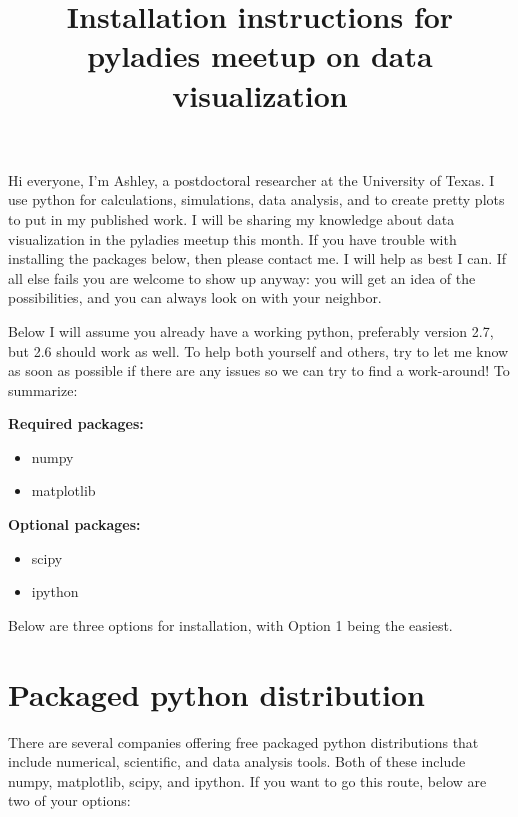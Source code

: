 \documentclass[11pt]{article}
\date{}
\title{Installation instructions for pyladies meetup on data visualization}
\begin{document}
\maketitle
Hi everyone, I'm Ashley, a postdoctoral researcher at the University of Texas. I use python for calculations, simulations, data analysis, and to create pretty plots to put in my published work. I will be sharing my knowledge about data visualization in the pyladies meetup this month. If you have trouble with installing the packages below, then please contact me. I will help as best I can. If all else fails you are welcome to show up anyway: you will get an idea of the possibilities, and you can always look on with your neighbor.

Below I will assume you already have a working python, preferably version 2.7, but 2.6 should work as well. To help both yourself and others, try to let me know as soon as possible if there are any issues so we can try to find a work-around! To summarize:

\textbf{Required packages:}
\begin{itemize}
\item numpy

\item matplotlib
\end{itemize}

\textbf{Optional packages:}
\begin{itemize}
\item scipy
\item ipython
\end{itemize}

Below are three options for installation, with Option 1 being the easiest.

\section{Packaged python distribution}
\label{sec-1}
There are several companies offering free packaged python distributions that include numerical, scientific, and data analysis tools. Both of these include numpy, matplotlib, scipy, and ipython. If you want to go this route, below are two of your options:
\end{document}
